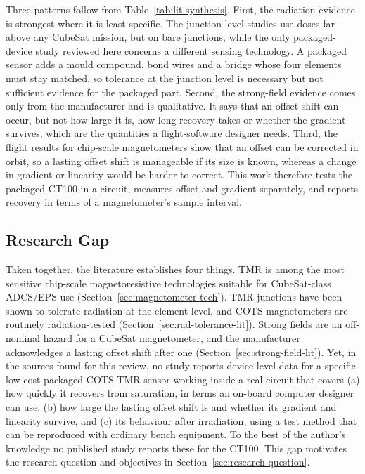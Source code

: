 \documentclass[12pt,a4paper]{article}
\begin{document}
Three patterns follow from Table~\ref{tab:lit-synthesis}. First, the radiation evidence is strongest where it is least specific. The junction-level studies use doses far above any CubeSat mission, but on bare junctions, while the only packaged-device study reviewed here concerns a different sensing technology. A packaged sensor adds a mould compound, bond wires and a bridge whose four elements must stay matched, so tolerance at the junction level is necessary but not sufficient evidence for the packaged part. Second, the strong-field evidence comes only from the manufacturer and is qualitative. It says that an offset shift can occur, but not how large it is, how long recovery takes or whether the gradient survives, which are the quantities a flight-software designer needs. Third, the flight results for chip-scale magnetometers show that an offset can be corrected in orbit, so a lasting offset shift is manageable if its size is known, whereas a change in gradient or linearity would be harder to correct. This work therefore tests the packaged CT100 in a circuit, measures offset and gradient separately, and reports recovery in terms of a magnetometer's sample interval.

\subsection{Research Gap}
\label{sec:gap}

Taken together, the literature establishes four things. TMR is among the most sensitive chip-scale magnetoresistive technologies suitable for CubeSat-class ADCS/EPS use (Section~\ref{sec:magnetometer-tech}). TMR junctions have been shown to tolerate radiation at the element level, and COTS magnetometers are routinely radiation-tested (Section~\ref{sec:rad-tolerance-lit}). Strong fields are an off-nominal hazard for a CubeSat magnetometer, and the manufacturer acknowledges a lasting offset shift after one (Section~\ref{sec:strong-field-lit}). Yet, in the sources found for this review, no study reports device-level data for a specific low-cost packaged COTS TMR sensor working inside a real circuit that covers (a) how quickly it recovers from saturation, in terms an on-board computer designer can use, (b) how large the lasting offset shift is and whether its gradient and linearity survive, and (c) its behaviour after irradiation, using a test method that can be reproduced with ordinary bench equipment. To the best of the author's knowledge no published study reports these for the CT100. This gap motivates the research question and objectives in Section~\ref{sec:research-question}.
\end{document}
